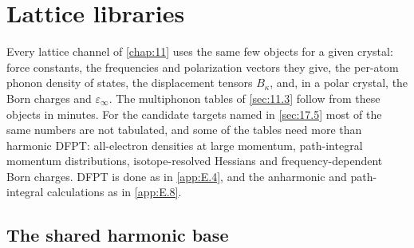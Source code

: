 \section{Lattice libraries}\label{app:E.17}

Every lattice channel of \cref{chap:11} uses the same few objects for a given crystal: force constants, the frequencies and polarization vectors they give, the per-atom phonon density of states, the displacement tensors $B_\kappa$, and, in a polar crystal, the Born charges and $\varepsilon_\infty$. The multiphonon tables of \cref{sec:11.3} follow from these objects in minutes. For the candidate targets named in \cref{sec:17.5} most of the same numbers are not tabulated, and some of the tables need more than harmonic DFPT: all-electron densities at large momentum, path-integral momentum distributions, isotope-resolved Hessians and frequency-dependent Born charges. DFPT is done as in \cref{app:E.4}, and the anharmonic and path-integral calculations as in \cref{app:E.8}.

\subsection{The shared harmonic base}


